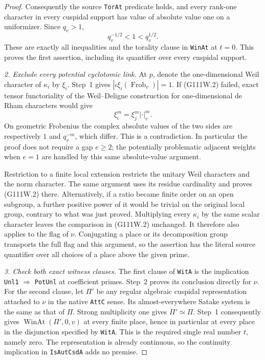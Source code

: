 \begin{proof}
Consequently the source \texttt{TorAt} predicate holds,
and every rank-one character in every cuspidal support
has value of absolute value one on a uniformizer.
Since \(q_v>1\),
\[
                      q_v^{-1/2}<1<q_v^{1/2}.
 \tag{G111W.3}
\]
These are exactly all inequalities and the torality
clause in \texttt{WinAt} at \(t=0\). This proves the
first assertion, including its quantifier over every
cuspidal support.

\emph{2. Exclude every potential cyclotomic link.}
At \(p\), denote the one-dimensional Weil character
of \(\kappa_i\) by \(\xi_i\). Step~1 gives
\(|\iota\xi_i(\operatorname{Frob}_v)|=1\).
If (G111W.2) failed, exact tensor functoriality of the
Weil--Deligne construction for one-dimensional de Rham
characters would give
\[
                    \xi_i^m=\xi_j^m|\cdot|_v^m.
 \tag{G111W.4}
\]
On geometric Frobenius the complex absolute values of
the two sides are respectively \(1\) and \(q_v^{-m}\),
which differ. This is a contradiction. In particular
the proof does not require a gap \(e\ge2\); the
potentially problematic adjacent weights when \(e=1\)
are handled by this same absolute-value argument.

Restriction to a finite local extension restricts the
unitary Weil characters and the norm character. The
same argument uses its residue cardinality and proves
(G111W.2) there. Alternatively, if a ratio became
finite order on an open subgroup, a further positive
power of it would be trivial on the original local
group, contrary to what was just proved. Multiplying
every \(\kappa_i\) by the same scalar character leaves
the comparison in (G111W.2) unchanged. It therefore
also applies to the flag of \(\nu\). Conjugating a
place or its decomposition group transports the full
flag and this argument, so the assertion has the
literal source quantifier over all choices of a place
above the given prime.

\emph{3. Check both exact witness clauses.}
The first clause of \texttt{WitA} is the implication
\texttt{Unl1} \(\Rightarrow\) \texttt{PotUnl} at
coefficient primes. Step~2 proves its conclusion
directly for \(\nu\). For the second clause, let
\(\Pi'\) be any regular algebraic cuspidal
representation attached to \(\nu\) in the native
\texttt{AttC} sense. Its almost-everywhere Satake system
is the same as that of \(\Pi\). Strong multiplicity
one gives \(\Pi'\simeq\Pi\). Step~1 consequently
gives \(\operatorname{WinAt}(\Pi',0,v)\) at every
finite place, hence in particular at every place in
the disjunction specified by \texttt{WitA}.
This is the required single real number \(t\), namely
zero. The representation is already continuous, so
the continuity implication in \texttt{IsAutCsdA} adds
no premise.


\end{proof}
